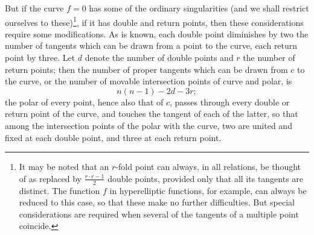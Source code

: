 \documentclass[10pt]{article}
\begin{document}
But if the curve $f=0$ has some of the ordinary singularities (and we shall restrict ourselves to these)\footnote{It may be noted that an $r$-fold point can always, in all relations, be thought of as replaced by $\frac{r\cdot r-1}{2}$ double points, provided only that all its tangents are distinct. The function $f$ in hyperelliptic functions, for example, can always be reduced to this case, so that these make no further difficulties. But special considerations are required when several of the tangents of a multiple point coincide.}, if it has double and return points, then these considerations require some modifications. As is known, each double point diminishes by two the number of tangents which can be drawn from a point to the curve, each return point by three. Let $d$ denote the number of double points and $r$ the number of return points; then the number of proper tangents which can be drawn from $c$ to the curve, or the number of movable intersection points of curve and polar, is
\[
n(n-1)-2d-3r;
\]
the polar of every point, hence also that of $c$, passes through every double or return point of the curve, and touches the tangent of each of the latter, so that among the intersection points of the polar with the curve, two are united and fixed at each double point, and three at each return point.
\end{document}
